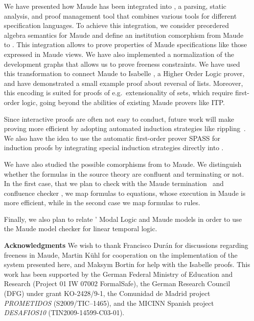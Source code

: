 
We have presented how Maude has been integrated into
\Hets, a parsing, static analysis, and proof management tool that
combines various tools for different specification languages. To
achieve this integration, we consider preordered algebra semantics for
Maude and define an institution comorphism from Maude to \CASL.  This
integration allows to prove properties of Maude specifications like
those expressed in Maude views. We have also implemented a
normalization of the development graphs that allows us to prove
freeness constraints. We have used this transformation to connect
Maude to Isabelle \cite{Isabelle02}, a Higher Order Logic prover, and
have demonstrated a small example proof about reversal of lists.
Moreover, this encoding is suited for proofs of e.g.\ extensionality
of sets, which require first-order logic, going beyond the abilities
of existing Maude provers like ITP.

Since interactive proofs are often not easy to conduct, future work
will make proving more efficient by adopting automated induction
strategies like rippling~\cite{DBLP:conf/tphol/DixonF04}.  We also
have the idea to use the automatic first-order prover SPASS for
induction proofs by integrating special induction strategies directly
into \Hets.

We have also studied the possible comorphisms from \CASL to Maude. We
distinguish whether the formulas in the source theory are confluent and
terminating or not. In the first case, that we plan to check with the
Maude termination~\cite{MTT08} and confluence checker \cite{ChurchRoss10},
we map formulas to equations,
whose execution in Maude is more efficient, while in the second case
we map formulas to rules.

Finally, we also plan to relate \Hets' Modal Logic and Maude models in order to use
the Maude model checker \cite[Chapter 13]{maude-book} for linear temporal
logic.


\textbf{Acknowledgments} We wish to thank Francisco Dur\'an for discussions 
regarding freeness in Maude, Martin K\"uhl for cooperation
on the implementation of the system presented here,
and Maksym Bortin for help with the Isabelle proofs.
This work has been
supported by the German Federal Ministry of Education and Research
(Project 01 IW 07002 FormalSafe), the German Research Council (DFG)
under grant KO-2428/9-1, the Comunidad de Madrid project \emph{PROMETIDOS}
(S2009/TIC--1465), and the MICINN Spanish project
\emph{DESAFIOS10} (TIN2009-14599-C03-01).


